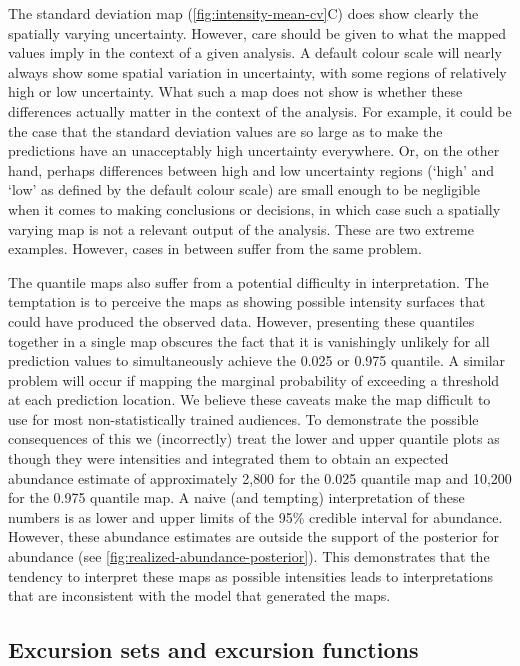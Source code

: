 \documentclass{stylefile16/statsoc}
\begin{document}
The standard deviation map (\autoref{fig:intensity-mean-cv}C) does show clearly the spatially varying uncertainty.  However,  care should be given to what the mapped values imply in the context of a given analysis.  A default colour scale will nearly always show some spatial variation in uncertainty, with some regions of relatively high or low uncertainty.  What such a map does not show is whether these differences actually matter in the context of the analysis.  For example, it could be the case that the standard deviation values are so large as to make the predictions have an unacceptably high uncertainty everywhere.  Or, on the other hand, perhaps differences between high and low uncertainty regions (`high' and `low' as defined by the default colour scale) are small enough to be negligible when it comes to making conclusions or decisions, in which case such a spatially varying map is not a relevant output of the analysis.  These are two extreme examples.  However, cases in between suffer from the same problem.

The quantile maps also suffer from a potential difficulty in interpretation. The temptation is to perceive the maps as showing possible intensity surfaces that could have produced the observed data.  However, presenting these quantiles together in a single map obscures the fact that it is vanishingly unlikely for all prediction values to simultaneously achieve the 0.025 or 0.975 quantile.  A similar problem will occur if mapping the marginal probability of exceeding a threshold at each prediction location.  We believe these caveats make the map difficult to use for most non-statistically trained audiences.  To demonstrate the possible consequences of this we (incorrectly) treat the lower and upper quantile plots as though they were intensities and integrated them to obtain an expected abundance estimate of approximately 2,800 for the 0.025 quantile map and 10,200 for the 0.975 quantile map.  A naive (and tempting) interpretation of these numbers is as lower and upper limits of the 95\% credible interval for abundance. However, these abundance estimates are outside the support of the posterior for abundance (see \autoref{fig:realized-abundance-posterior}).  This demonstrates that the tendency to interpret these maps as possible intensities leads to interpretations that are inconsistent with the model that generated the maps.

\subsection{Excursion sets and excursion functions}
\end{document}
